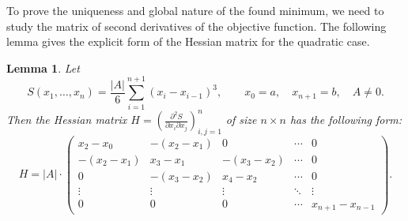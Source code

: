 \documentclass[amstex,16pt, amssymb]{article}
\theoremstyle{plain}
\newtheorem{lemma}{Lemma}[section]
\theoremstyle{definition}
\numberwithin{equation}{section}
\numberwithin{equation}{section}
\begin{document}

To prove the uniqueness and global nature of the found minimum, we need to study the matrix of second derivatives of the objective function. The following lemma gives the explicit form of the Hessian matrix for the quadratic case.



\begin{lemma}\label{lemma4}
Let
\[
S(x_1, \dots, x_n) = \frac{|A|}{6} \sum_{i=1}^{n+1} (x_i - x_{i-1})^3, \qquad x_0 = a, \quad x_{n+1} = b, \quad A\neq 0.
\]
Then the Hessian matrix
$
H = \left( \frac{\partial^2 S}{\partial x_i \partial x_j} \right)_{i,j=1}^{n}
$
of size \( n \times n \) has the following form:
\[
H = |A| \cdot
\begin{pmatrix}
x_2 - x_0 & -(x_2 - x_1) & 0 & \cdots & 0 \\
-(x_2 - x_1) & x_3 - x_1 & -(x_3 - x_2) & \cdots & 0 \\
0 & -(x_3 - x_2) & x_4 - x_2 & \cdots & 0 \\
\vdots & \vdots & \vdots & \ddots & \vdots \\
0 & 0 & 0 & \cdots & x_{n+1} - x_{n-1}
\end{pmatrix}.
\]

\end{lemma}
\end{document}
